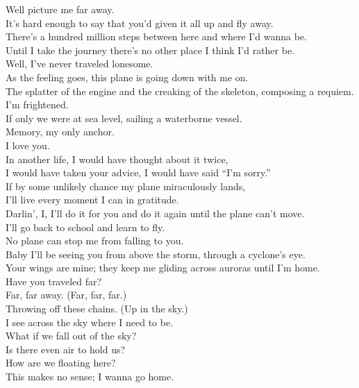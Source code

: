 Well picture me far away. \\
It's hard enough to say that you'd given it all up and fly away. \\
There's a hundred million steps between here and where I'd wanna be. \\
Until I take the journey there's no other place I think I'd rather be. \\

Well, I've never traveled lonesome. \\
As the feeling goes, this plane is going down with me on. \\

The splatter of the engine and the creaking of the skeleton, composing a requiem. \\
I'm frightened. \\
If only we were at sea level, sailing a waterborne vessel. \\
Memory, my only anchor. \\
I love you. \\
In another life, I would have thought about it twice, \\
I would have taken your advice, I would have said ``I'm sorry.'' \\
If by some unlikely chance my plane miraculously lands, \\
I'll live every moment I can in gratitude. \\

Darlin', I, I'll do it for you and do it again until the plane can't move. \\
I'll go back to school and learn to fly. \\
No plane can stop me from falling to you. \\
Baby I'll be seeing you from above the storm, through a cyclone's eye. \\
Your wings are mine; they keep me gliding across auroras until I'm home. \\

Have you traveled far? \\
Far, far away. (Far, far, far.) \\
Throwing off these chains. (Up in the sky.) \\
I see across the sky where I need to be. \\

What if we fall out of the sky? \\
Is there even air to hold us? \\
How are we floating here? \\
This makes no sense; I wanna go home. \\

